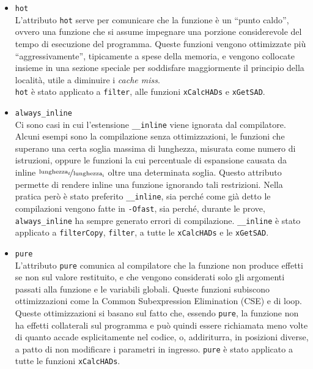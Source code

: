 \begin{itemize}
	\item\verb|hot|\\
	L'attributo \verb|hot| serve per comunicare che la funzione è un ``punto 
	caldo'', ovvero una funzione che si assume impegnare una 
	porzione considerevole del tempo di esecuzione del programma.
	Queste funzioni vengono ottimizzate più ``aggressivamente'', tipicamente a 
	spese della memoria, e vengono collocate insieme in una sezione speciale 
	per soddisfare maggiormente il principio della località, utile a diminuire 
	i \emph{cache miss}.\\
	\verb|hot| è stato applicato a \verb|filter|, alle funzioni 
	\verb|xCalcHADs| e \verb|xGetSAD|.
	
	\item\verb|always_inline|\\
	Ci sono casi in cui l'estensione \verb|__inline| viene ignorata dal 
	compilatore. Alcuni esempi sono la compilazione senza ottimizzazioni, le 
	funzioni che superano una certa soglia massima di lunghezza, misurata come 
	numero di istruzioni, oppure le funzioni la cui percentuale di espansione 
	causata da inline 
	$\nicefrac{\text{lunghezza}_\text{f}}{\text{lunghezza}_\text{i}}$ 
	 oltre una determinata soglia.
	Questo attributo permette di rendere inline una funzione ignorando tali 
	restrizioni. Nella pratica però è stato preferito \verb|__inline|, sia 
	perché come già detto le compilazioni vengono fatte in \verb|-Ofast|, sia 
	perché, durante le prove, \verb|always_inline| ha sempre generato errori di 
	compilazione. \verb|__inline| è stato applicato a \verb|filterCopy|, 
	\verb|filter|, a 
	tutte le \verb|xCalcHADs| e le \verb|xGetSAD|.

	\item\verb|pure|\\
	L'attributo \verb|pure| comunica al compilatore che la funzione non produce 
	effetti se non sul valore restituito, e che vengono considerati solo gli 
	argomenti passati alla funzione e le variabili globali. Queste funzioni 
	subiscono ottimizzazioni come la Common Subexpression Elimination (CSE) e 
	di loop. Queste ottimizzazioni si basano sul fatto 
	che, essendo \verb|pure|, la funzione non ha effetti collaterali sul 
	programma e 
	può quindi essere richiamata meno volte di quanto accade esplicitamente nel 
	codice, o, addiriturra, in posizioni diverse, a patto di non modificare i 
	parametri in ingresso. \verb|pure| è stato applicato a tutte le 
	funzioni \verb|xCalcHADs|.
	

\end{itemize}
